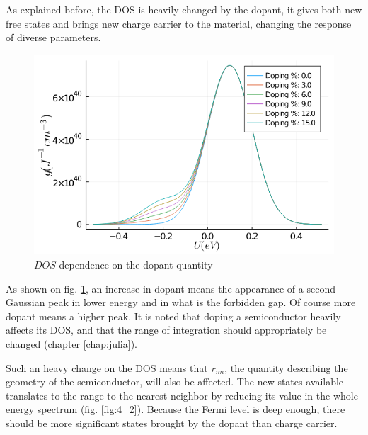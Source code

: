 As explained before, the DOS is heavily changed by the dopant, it gives both new free states and brings new charge carrier to the material, changing the response of diverse parameters.

\begin{figure}[!h]
    \centering
    \includegraphics*[width=.5\paperwidth]{figures/4_thermal/dos_doped}
    \caption{$DOS$ dependence on the dopant quantity\label{fig:4_1}}
\end{figure}

As shown on fig. \ref{fig:4_1}, an increase in dopant means the appearance of a second Gaussian peak in lower energy and in what is the forbidden gap. Of course more dopant means a higher peak. It is noted that doping a semiconductor heavily affects its DOS, and that the range of integration should appropriately be changed (chapter \ref{chap:julia}).

\vspace{1em}

Such an heavy change on the DOS means that $r_{nn}$, the quantity describing the geometry of the semiconductor, will also be affected. The new states available translates to the range to the nearest neighbor by reducing its value in the whole energy spectrum (fig. \ref{fig:4_2}). Because the Fermi level is deep enough, there should be more significant states brought by the dopant than charge carrier.

